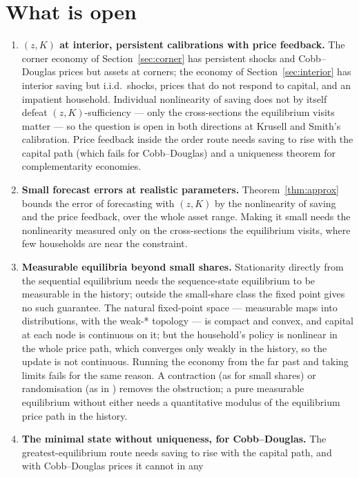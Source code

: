 \section{What is open}\label{sec:open}

\begin{enumerate}[leftmargin=*,itemsep=2pt]
\item \textbf{$(z,K)$ at interior, persistent calibrations with price feedback.} The corner
  economy of Section~\ref{sec:corner} has persistent shocks and Cobb--Douglas prices but assets at
  corners; the economy of Section~\ref{sec:interior} has interior saving but i.i.d.\ shocks, prices
  that do not respond to capital, and an impatient household. Individual nonlinearity of saving
  does not by itself defeat $(z,K)$-sufficiency --- only the cross-sections the equilibrium visits
  matter --- so the question is open in both directions at Krusell and Smith's calibration. Price
  feedback inside the order route needs saving to rise with the capital path (which fails for
  Cobb--Douglas) and a uniqueness theorem for complementarity economies.
\item \textbf{Small forecast errors at realistic parameters.} Theorem~\ref{thm:approx} bounds the
  error of forecasting with $(z,K)$ by the nonlinearity of saving and the price feedback, over the
  whole asset range. Making it small needs the nonlinearity measured only on the cross-sections the
  equilibrium visits, where few households are near the constraint.
\item \textbf{Measurable equilibria beyond small shares.} Stationarity directly from the sequential
  equilibrium needs the sequence-state equilibrium to be measurable in the history; outside the
  small-share class the fixed point gives no such guarantee. The natural fixed-point space ---
  measurable maps into distributions, with the weak-* topology --- is compact and convex, and
  capital at each node is continuous on it; but the household's policy is nonlinear in the whole
  price path, which converges only weakly in the history, so the update is not continuous. Running
  the economy from the far past and taking limits fails for the same reason. A contraction (as for
  small shares) or randomisation (as in \citet{dgmm1994}) removes the obstruction; a pure measurable
  equilibrium without either needs a quantitative modulus of the equilibrium price path in the
  history.
\item \textbf{The minimal state without uniqueness, for Cobb--Douglas.} The greatest-equilibrium
  route needs saving to rise with the capital path, and with Cobb--Douglas prices it cannot in any

\end{enumerate}
